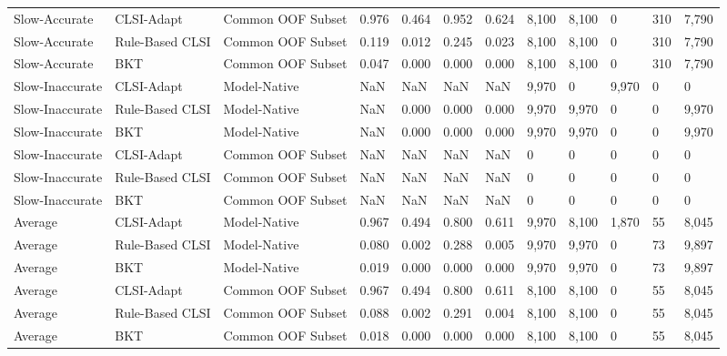 \begin{table}[ht]
\begin{tabular}{llllllllllll}
Slow-Accurate & CLSI-Adapt & Common OOF Subset & 0.976 & 0.464 & 0.952 & 0.624 & 8,100 & 8,100 & 0 & 310 & 7,790 \\
Slow-Accurate & Rule-Based CLSI & Common OOF Subset & 0.119 & 0.012 & 0.245 & 0.023 & 8,100 & 8,100 & 0 & 310 & 7,790 \\
Slow-Accurate & BKT & Common OOF Subset & 0.047 & 0.000 & 0.000 & 0.000 & 8,100 & 8,100 & 0 & 310 & 7,790 \\
Slow-Inaccurate & CLSI-Adapt & Model-Native & NaN & NaN & NaN & NaN & 9,970 & 0 & 9,970 & 0 & 0 \\
Slow-Inaccurate & Rule-Based CLSI & Model-Native & NaN & 0.000 & 0.000 & 0.000 & 9,970 & 9,970 & 0 & 0 & 9,970 \\
Slow-Inaccurate & BKT & Model-Native & NaN & 0.000 & 0.000 & 0.000 & 9,970 & 9,970 & 0 & 0 & 9,970 \\
Slow-Inaccurate & CLSI-Adapt & Common OOF Subset & NaN & NaN & NaN & NaN & 0 & 0 & 0 & 0 & 0 \\
Slow-Inaccurate & Rule-Based CLSI & Common OOF Subset & NaN & NaN & NaN & NaN & 0 & 0 & 0 & 0 & 0 \\
Slow-Inaccurate & BKT & Common OOF Subset & NaN & NaN & NaN & NaN & 0 & 0 & 0 & 0 & 0 \\
Average & CLSI-Adapt & Model-Native & 0.967 & 0.494 & 0.800 & 0.611 & 9,970 & 8,100 & 1,870 & 55 & 8,045 \\
Average & Rule-Based CLSI & Model-Native & 0.080 & 0.002 & 0.288 & 0.005 & 9,970 & 9,970 & 0 & 73 & 9,897 \\
Average & BKT & Model-Native & 0.019 & 0.000 & 0.000 & 0.000 & 9,970 & 9,970 & 0 & 73 & 9,897 \\
Average & CLSI-Adapt & Common OOF Subset & 0.967 & 0.494 & 0.800 & 0.611 & 8,100 & 8,100 & 0 & 55 & 8,045 \\
Average & Rule-Based CLSI & Common OOF Subset & 0.088 & 0.002 & 0.291 & 0.004 & 8,100 & 8,100 & 0 & 55 & 8,045 \\
Average & BKT & Common OOF Subset & 0.018 & 0.000 & 0.000 & 0.000 & 8,100 & 8,100 & 0 & 55 & 8,045 \\
\bottomrule
\end{tabular}
\end{table}